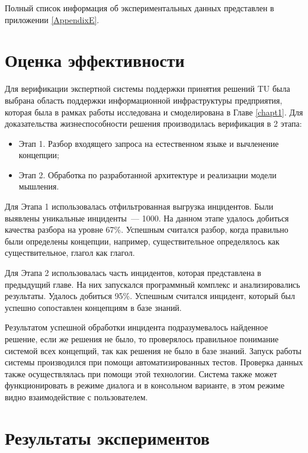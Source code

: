 Полный список информация об экспериментальных данных представлен в приложении \ref{AppendixE}.




\section{Оценка эффективности}
Для верификации экспертной системы поддержки принятия решений TU была выбрана область поддержки информационной инфраструктуры предприятия, которая была в рамках работы исследована и смоделирована в Главе \ref{chapt1}. 
Для доказательства жизнеспособности решения производилась верификация в 2 этапа:
\begin{itemize}
	\item Этап 1. Разбор входящего запроса на естественном языке и вычленение концепции;
	\item Этап 2. Обработка по разработанной архитектуре и реализации модели мышления.  
\end{itemize} \par
Для Этапа 1 использовалась отфильтрованная выгрузка инцидентов. Были выявлены уникальные инциденты~--- 1000. На данном этапе удалось добиться качества разбора на уровне 67\%. Успешным считался разбор, когда правильно были определены концепции, например, существительное определялось как существительное, глагол как глагол. \par
Для Этапа 2 использовалась часть инцидентов, которая представлена в предыдущий главе. На них запускался программный комплекс и анализировались результаты. Удалось добиться 95\%. Успешным считался инцидент, который был успешно сопоставлен концепциям в базе знаний. \par
Результатом успешной обработки инцидента подразумевалось найденное решение, если же решения не было, то проверялось правильное понимание системой всех концепций, так как решения не было в базе знаний. Запуск работы системы производился при помощи автоматизированных тестов. Проверка данных также осуществлялась при помощи этой технологии. Система также может функционировать в режиме диалога и в консольном варианте, в этом режиме видно взаимодействие с пользователем. 



\section{Результаты экспериментов}

